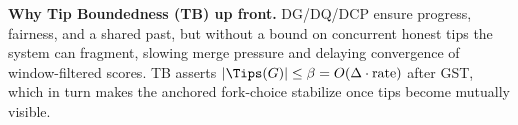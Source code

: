 
\noindent\textbf{Why Tip Boundedness (TB) up front.} 
DG/DQ/DCP ensure progress, fairness, and a shared past, but without a bound on concurrent honest tips the system can fragment, 
slowing merge pressure and delaying convergence of window-filtered scores. TB asserts $|\Tips(G)|\le \beta = O(\Delta\cdot\text{rate})$ after GST, 
which in turn makes the anchored fork-choice stabilize once tips become mutually visible.
